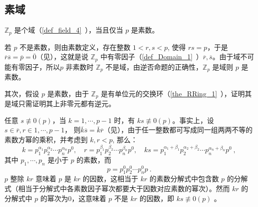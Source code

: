 

\subsection{素域}\label{sub_FmLT_1}

\begin{lemma}{}\label{lem_FmLT_1}
 $\mathbb Z_p$ 是个域（\autoref{def_field_4}~），当且仅当 $p$ 是素数。
\end{lemma}


若 $p$ 不是素数，则由素数定义，存在整数 $1<r,s<p$, 使得 $rs=p$，于是 $\overline r\overline s=\overline p=\overline 0$（见），这就是说 $\mathbb Z_p$ 中有零因子（\autoref{def_Domain_1}~）$\overline r,\overline s$。由于域不可能有零因子，所以$p$ 非素数时 $\mathbb Z_p$ 不是域，由逆否命题的正确性，$\mathbb Z_p$ 是域则 $p$ 是素数。

其次，假设 $p$ 是素数，由于 $\mathbb Z_p$ 是有单位元的交换环（\autoref{the_RRing_1}~），证明其是域只需证明其上非零元都有逆元。

任意 $s\not\equiv 0(p)$，当 $k=1,\cdots,p-1$ 时，有 $ks\not\equiv 0(p)$。事实上，设 $s\in\overline r, r\in{1,\cdots,p-1}$， 则$\overline k\overline s=\overline k\overline r$（见），由于任一整数都可写成同一组两两不等的素数方幂的乘积，并考虑到 $k,r<p$, 那么：
\begin{equation}
k=p_1^{\alpha_1}p_2^{\alpha_2}\cdots p_n^{\alpha_n}p^0, \quad r=p_1^{\beta_1}p_2^{\beta_2}\cdots p_n^{\beta_n}p^0,\quad ks=p_1^{\alpha_1+\beta_1}p_2^{\alpha_2+\beta_2}\cdots p_n^{\alpha_n+\beta_n}p^0~,
\end{equation}
其中 $p_1,\cdots,p_n$ 是小于 $p$ 的素数，而
\begin{equation}
p=p_1^0p_2^0\cdots p_n^{0}p~.
\end{equation}
$p$ 整除 $kr$ 意味着 $p$ 是 $kr$ 的因数，这相当于 $kr$ 的素数分解式中包含数 $p$ 的分解式（相当于分解式中各素数因子幂次都要大于因数对应素数的幂次）。然而 $kr$ 的分解式中 $p$ 的幂次为0，这意味着 $p$ 不是 $kr$ 的因数，即 $ks\not\equiv 0(p)$ 。

